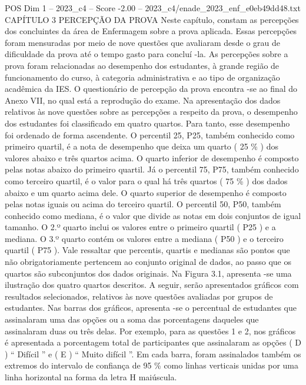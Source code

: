 \begin{textsample}{POS Dim 1 – 2023\_c4 – Score -2.00 – 2023\_c4/enade\_2023\_enf\_e0eb49dd48.txt}  \label{ex:f1_pos_198}
CAPÍTULO 3 PERCEPÇÃO DA PROVA Neste capítulo, constam as percepções dos concluintes da área de Enfermagem sobre a prova aplicada.
Essas percepções foram mensuradas por meio de nove questões que avaliaram desde o grau de dificuldade da prova até o tempo gasto para concluí -la.
As percepções sobre a prova foram relacionadas ao desempenho dos estudantes, à grande região de funcionamento do curso, à categoria administrativa e ao tipo de organização acadêmica da IES.
O questionário de percepção da prova encontra -se ao final do Anexo VII, no qual está a reprodução do exame.
Na apresentação dos dados relativos às nove questões sobre as percepções a respeito da prova, o desempenho dos estudantes foi classificado em quatro quartos.
Para tanto, esse desempenho foi ordenado de forma ascendente.
O percentil 25, P25, também conhecido como primeiro quartil, é a nota de desempenho que deixa um quarto ( 25 \% ) dos valores abaixo e três quartos acima.
O quarto inferior de desempenho é composto pelas notas abaixo do primeiro quartil.
Já o percentil 75, P75, também conhecido como terceiro quartil, é o valor para o qual há três quartos ( 75 \% ) dos dados abaixo e um quarto acima dele.
O quarto superior de desempenho é composto pelas notas iguais ou acima do terceiro quartil.
O percentil 50, P50, também conhecido como mediana, é o valor que divide as notas em dois conjuntos de igual tamanho.
O 2.º quarto inclui os valores entre o primeiro quartil ( P25 ) e a mediana.
O 3.º quarto contém os valores entre a mediana ( P50 ) e o terceiro quartil ( P75 ).
Vale ressaltar que percentis, quartis e medianas são pontos que não obrigatoriamente pertencem ao conjunto original de dados, ao passo que os quartos são subconjuntos dos dados originais.
Na Figura 3.1, apresenta -se uma ilustração dos quatro quartos descritos.
A seguir, serão apresentados gráficos com resultados selecionados, relativos às nove questões avaliadas por grupos de estudantes.
Nas barras dos gráficos, apresenta -se o percentual de estudantes que assinalaram uma das opções ou a soma das porcentagens daqueles que assinalaram duas ou três delas.
Por exemplo, para as questões 1 e 2, nos gráficos é apresentada a porcentagem total de participantes que assinalaram as opções ( D ) “ Difícil ” e ( E ) “ Muito difícil ”.
Em cada barra, foram assinalados também os extremos do intervalo de confiança de 95 \% como linhas verticais unidas por uma linha horizontal na forma da letra H maiúscula.

\end{textsample}
